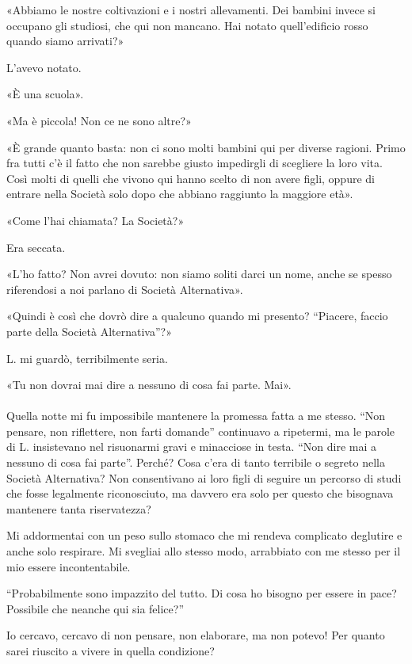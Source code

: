 \documentclass[a4paper,12pt]{book}
\begin{document}
«Abbiamo le nostre coltivazioni e i nostri allevamenti. Dei bambini invece si
occupano gli studiosi, che qui non mancano. Hai notato quell'edificio rosso
quando siamo arrivati?»

L'avevo notato.

«È una scuola».

«Ma è piccola! Non ce ne sono altre?»

«È grande quanto basta: non ci sono molti bambini qui per diverse ragioni. Primo
fra tutti c'è il fatto che non sarebbe giusto impedirgli di scegliere la loro
vita. Così molti di quelli che vivono qui hanno scelto di non avere figli,
oppure di entrare nella Società solo dopo che abbiano raggiunto la maggiore
età».

«Come l'hai chiamata? La Società?»

Era seccata.

«L'ho fatto? Non avrei dovuto: non siamo soliti darci un nome, anche se spesso
riferendosi a noi parlano di Società Alternativa».

«Quindi è così che dovrò dire a qualcuno quando mi presento? ``Piacere, faccio
parte della Società Alternativa''?»

L. mi guardò, terribilmente seria.

«Tu non dovrai mai dire a nessuno di cosa fai parte. Mai».

\paragraph{}
Quella notte mi fu impossibile mantenere la promessa fatta a me stesso. ``Non
pensare, non riflettere, non farti domande'' continuavo a ripetermi, ma le
parole di L. insistevano nel risuonarmi gravi e minacciose in testa. ``Non dire
mai a nessuno di cosa fai parte''. Perché? Cosa c'era di tanto terribile o
segreto nella Società Alternativa? Non consentivano ai loro figli di seguire un
percorso di studi che fosse legalmente riconosciuto, ma davvero era solo per
questo che bisognava mantenere tanta riservatezza?

Mi addormentai con un peso sullo stomaco che mi rendeva complicato deglutire e
anche solo respirare. Mi svegliai allo stesso modo, arrabbiato con me stesso
per il mio essere incontentabile.

``Probabilmente sono impazzito del tutto. Di cosa ho bisogno per essere in pace?
Possibile che neanche qui sia felice?''

Io cercavo, cercavo di non pensare, non elaborare, ma non potevo! Per quanto
sarei riuscito a vivere in quella condizione?
\end{document}
